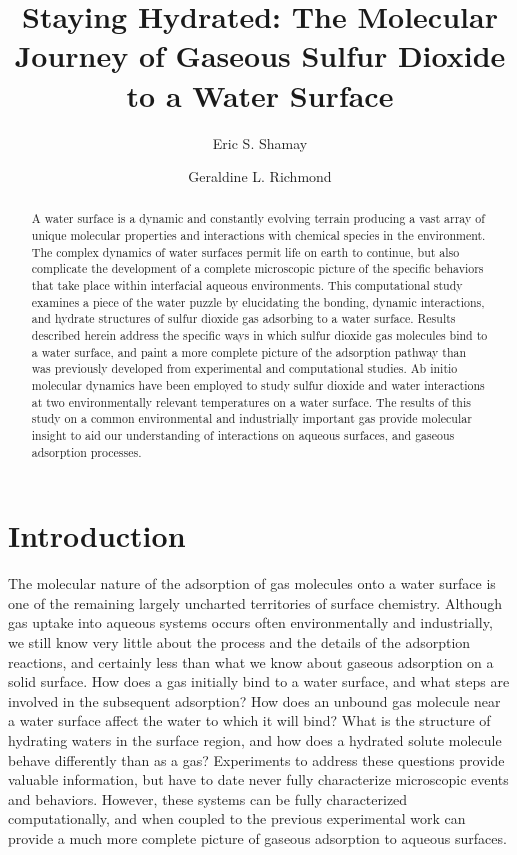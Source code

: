 \documentclass{article}
\title{Staying Hydrated: The Molecular Journey of Gaseous Sulfur Dioxide to a Water Surface}
\author{Eric S. Shamay \and Geraldine L. Richmond}
\begin{document}
\newcommand{\suldiox}{SO$_2$}
\newcommand{\ang}{\,$\textrm{\AA}$}
\newcommand{\angs}{\ang}
\newcommand{\wat}{H$_2$O}

\maketitle

\doublespacing


\begin{abstract}
A water surface is a dynamic and constantly evolving terrain producing a vast array of unique molecular properties and interactions with chemical species in the environment. The complex dynamics of water surfaces permit life on earth to continue, but also complicate the development of a complete microscopic picture of the specific behaviors that take place within interfacial aqueous environments. This computational study examines a piece of the water puzzle by elucidating the bonding, dynamic interactions, and hydrate structures of sulfur dioxide gas adsorbing to a water surface. Results described herein address the specific ways in which sulfur dioxide gas molecules bind to a water surface, and paint a more complete picture of the adsorption pathway than was previously developed from experimental and computational studies. Ab initio molecular dynamics have been employed to study sulfur dioxide and water interactions at two environmentally relevant temperatures on a water surface. The results of this study on a common environmental and industrially important gas provide molecular insight to aid our understanding of interactions on aqueous surfaces, and gaseous adsorption processes.
\end{abstract}

\section {Introduction}

The molecular nature of the adsorption of gas molecules onto a water surface is one of the remaining largely uncharted territories of surface chemistry. Although gas uptake into aqueous systems occurs often environmentally and industrially, we still know very little about the process and the details of the adsorption reactions, and certainly less than what we know about gaseous adsorption on a solid surface. How does a gas initially bind to a water surface, and what steps are involved in the subsequent adsorption? How does an unbound gas molecule near a water surface affect the water to which it will bind? What is the structure of hydrating waters in the surface region, and how does a hydrated solute molecule behave differently than as a gas? Experiments to address these questions provide valuable information, but have to date never fully characterize microscopic events and behaviors. However, these systems can be fully characterized computationally, and when coupled to the previous experimental work can provide a much more complete picture of gaseous adsorption to aqueous surfaces.
\end{document}
